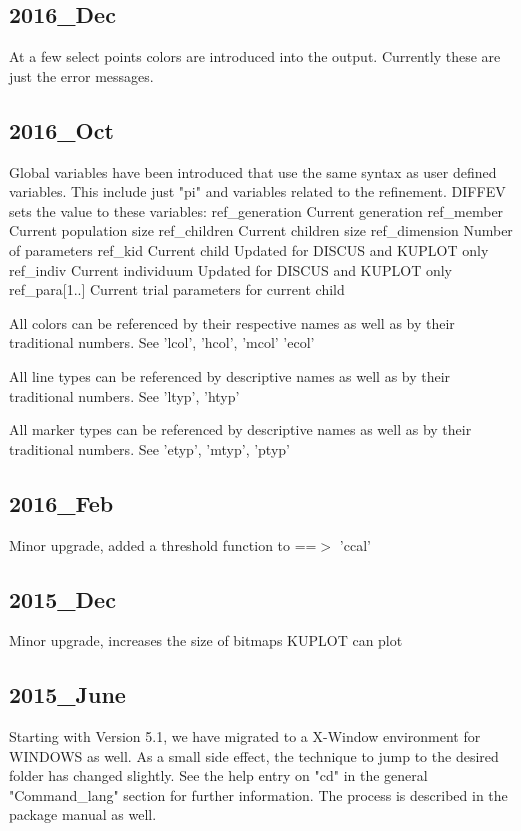 \subsection*{2016\_Dec}
\par
At a few select points colors are introduced into the output. 
Currently these are just the error messages. 
\par
\subsection*{2016\_Oct}
\par
Global variables have been introduced that use the same syntax as 
user defined variables. This include just "pi" and variables related 
to the refinement. 
DIFFEV sets the value to these variables: 
ref\_generation  Current generation 
ref\_member      Current population size 
ref\_children    Current children size 
ref\_dimension   Number of parameters 
ref\_kid         Current child Updated for DISCUS and KUPLOT only 
ref\_indiv       Current individuum Updated for DISCUS and KUPLOT only 
ref\_para[1..]   Current trial parameters for current child 
\par
All colors can be referenced by their respective names as well as by 
their traditional numbers. See 'lcol', 'hcol', 'mcol' 'ecol' 
\par
All line types can be referenced by descriptive names as well as by 
their traditional numbers. See 'ltyp', 'htyp' 
\par
All marker types can be referenced by descriptive names as well as by 
their traditional numbers. See 'etyp', 'mtyp', 'ptyp' 
\subsection*{2016\_Feb}
\par
Minor upgrade, added a threshold function to ==$> $ 'ccal' 
\subsection*{2015\_Dec}
\par
Minor upgrade, increases the size of bitmaps KUPLOT can plot 
\subsection*{2015\_June}
\par
Starting with Version 5.1, we have migrated to a X-Window 
environment for WINDOWS as well. As a small side effect, 
the technique to jump to the desired folder has changed slightly. 
See the help entry on "cd" in the general "Command\_lang" section 
for further information. The process is described in the 
package manual as well. 
